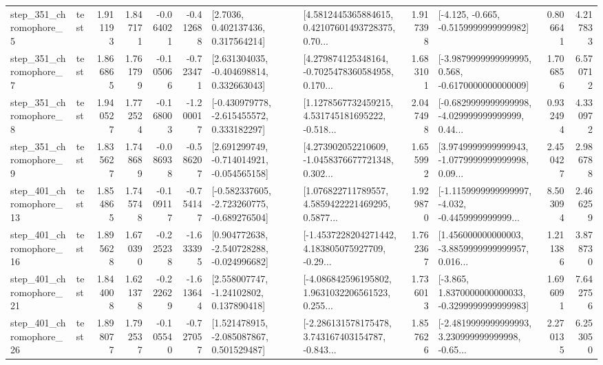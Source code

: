 \begin{tabular}{llrrrrllrlrr}
   step\_351\_chromophore\_5 &      test &      1.911193 &    1.847171 &     -0.064021 & -0.412688 &          [2.7036, 0.402137436, 0.317564214] &  [4.5812445365884615, 0.42107601493728375, 0.70... &       1.917398 &              [-4.125, -0.665, -0.5159999999999982] &            0.806641 &          4.217833 \\
   step\_351\_chromophore\_7 &      test &      1.866865 &    1.761799 &     -0.105066 & -0.723471 &    [2.631304035, -0.404698814, 0.332663043] &  [4.279874125348164, -0.7025478360584958, 0.170... &       1.683101 &  [-3.9879999999999995, 0.568, -0.6170000000000009] &            1.706856 &          6.570712 \\
   step\_351\_chromophore\_8 &      test &      1.940527 &    1.772524 &     -0.168003 & -1.200017 &   [-0.430979778, -2.615455572, 0.333182297] &  [1.1278567732459215, 4.531745181695222, -0.518... &       2.047498 &  [-0.6829999999999998, -4.029999999999999, 0.44... &            0.932494 &          4.330972 \\
   step\_351\_chromophore\_9 &      test &      1.835627 &    1.748689 &     -0.086938 & -0.586207 &   [2.691299749, -0.714014921, -0.054565158] &  [4.273902052210609, -1.0458376677721348, 0.302... &       1.655992 &  [3.9749999999999943, -1.0779999999999998, 0.09... &            2.450427 &          2.986788 \\
  step\_401\_chromophore\_13 &      test &      1.854865 &    1.745748 &     -0.109117 & -0.754147 &  [-0.582337605, -2.723260775, -0.689276504] &  [1.076822711789557, 4.5859422221469295, 0.5877... &       1.929870 &  [-1.1159999999999997, -4.032, -0.4459999999999... &            8.503094 &          2.466259 \\
  step\_401\_chromophore\_16 &      test &      1.895628 &    1.670390 &     -0.225238 & -1.633395 &   [0.904772638, -2.540728288, -0.024996682] &  [-1.4537228204271442, 4.183805075927709, -0.29... &       1.762367 &  [1.456000000000003, -3.8859999999999957, 0.016... &            1.211386 &          3.878730 \\
  step\_401\_chromophore\_21 &      test &      1.844008 &    1.621378 &     -0.222629 & -1.613644 &     [2.558007747, -1.24102802, 0.137890418] &  [-4.086842596195802, 1.9631032206561523, 0.255... &       1.736013 &  [-3.865, 1.8370000000000033, -0.3299999999999983] &            1.696091 &          7.642756 \\
  step\_401\_chromophore\_26 &      test &      1.898077 &    1.792537 &     -0.105540 & -0.727057 &    [1.521478915, -2.085087867, 0.501529487] &  [-2.286131578175478, 3.743167403154787, -0.843... &       1.857626 &  [-2.4819999999999993, 3.230999999999998, -0.65... &            2.270135 &          6.253050 \\

\end{tabular}

